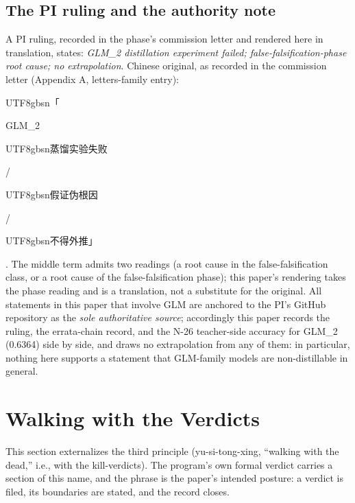 \documentclass[11pt]{article}
\begin{document}
\subsection{The PI ruling and the authority note}
\noindent A PI ruling, recorded in the phase's commission letter and rendered here in translation, states: \emph{GLM\_2 distillation experiment failed; false-falsification-phase root cause; no extrapolation}. Chinese original, as recorded in the commission letter (Appendix A, letters-family entry): \begin{CJK}{UTF8}{gbsn}「\end{CJK}GLM\_2 \begin{CJK}{UTF8}{gbsn}蒸馏实验失败\end{CJK} / \begin{CJK}{UTF8}{gbsn}假证伪根因\end{CJK} / \begin{CJK}{UTF8}{gbsn}不得外推」\end{CJK}. The middle term admits two readings (a root cause in the false-falsification class, or a root cause of the false-falsification phase); this paper's rendering takes the phase reading and is a translation, not a substitute for the original. All statements in this paper that involve GLM are anchored to the PI's GitHub repository as the \emph{sole authoritative source}; accordingly this paper records the ruling, the errata-chain record, and the N-26 teacher-side accuracy for GLM\_2 (0.6364) side by side, and draws no extrapolation from any of them: in particular, nothing here supports a statement that GLM-family models are non-distillable in general.\par
\section{Walking with the Verdicts}
\label{sec:16}
\noindent This section externalizes the third principle (yu-si-tong-xing, ``walking with the dead,'' i.e., with the kill-verdicts). The program's own formal verdict carries a section of this name, and the phrase is the paper's intended posture: a verdict is filed, its boundaries are stated, and the record closes.\par
\end{document}
